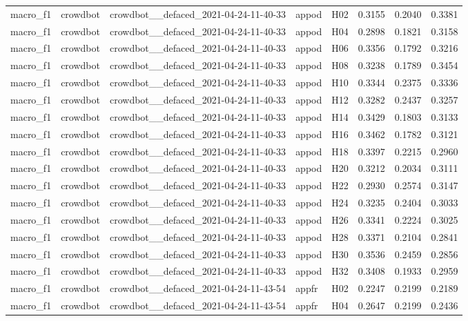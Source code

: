 \begin{table}[tbp]
\begin{tabular}{lllllrrr}
macro\_f1 & crowdbot & crowdbot\_\_defaced\_2021-04-24-11-40-33 & appod & H02 & 0.3155 & 0.2040 & 0.3381 \\
macro\_f1 & crowdbot & crowdbot\_\_defaced\_2021-04-24-11-40-33 & appod & H04 & 0.2898 & 0.1821 & 0.3158 \\
macro\_f1 & crowdbot & crowdbot\_\_defaced\_2021-04-24-11-40-33 & appod & H06 & 0.3356 & 0.1792 & 0.3216 \\
macro\_f1 & crowdbot & crowdbot\_\_defaced\_2021-04-24-11-40-33 & appod & H08 & 0.3238 & 0.1789 & 0.3454 \\
macro\_f1 & crowdbot & crowdbot\_\_defaced\_2021-04-24-11-40-33 & appod & H10 & 0.3344 & 0.2375 & 0.3336 \\
macro\_f1 & crowdbot & crowdbot\_\_defaced\_2021-04-24-11-40-33 & appod & H12 & 0.3282 & 0.2437 & 0.3257 \\
macro\_f1 & crowdbot & crowdbot\_\_defaced\_2021-04-24-11-40-33 & appod & H14 & 0.3429 & 0.1803 & 0.3133 \\
macro\_f1 & crowdbot & crowdbot\_\_defaced\_2021-04-24-11-40-33 & appod & H16 & 0.3462 & 0.1782 & 0.3121 \\
macro\_f1 & crowdbot & crowdbot\_\_defaced\_2021-04-24-11-40-33 & appod & H18 & 0.3397 & 0.2215 & 0.2960 \\
macro\_f1 & crowdbot & crowdbot\_\_defaced\_2021-04-24-11-40-33 & appod & H20 & 0.3212 & 0.2034 & 0.3111 \\
macro\_f1 & crowdbot & crowdbot\_\_defaced\_2021-04-24-11-40-33 & appod & H22 & 0.2930 & 0.2574 & 0.3147 \\
macro\_f1 & crowdbot & crowdbot\_\_defaced\_2021-04-24-11-40-33 & appod & H24 & 0.3235 & 0.2404 & 0.3033 \\
macro\_f1 & crowdbot & crowdbot\_\_defaced\_2021-04-24-11-40-33 & appod & H26 & 0.3341 & 0.2224 & 0.3025 \\
macro\_f1 & crowdbot & crowdbot\_\_defaced\_2021-04-24-11-40-33 & appod & H28 & 0.3371 & 0.2104 & 0.2841 \\
macro\_f1 & crowdbot & crowdbot\_\_defaced\_2021-04-24-11-40-33 & appod & H30 & 0.3536 & 0.2459 & 0.2856 \\
macro\_f1 & crowdbot & crowdbot\_\_defaced\_2021-04-24-11-40-33 & appod & H32 & 0.3408 & 0.1933 & 0.2959 \\
macro\_f1 & crowdbot & crowdbot\_\_defaced\_2021-04-24-11-43-54 & appfr & H02 & 0.2247 & 0.2199 & 0.2189 \\
macro\_f1 & crowdbot & crowdbot\_\_defaced\_2021-04-24-11-43-54 & appfr & H04 & 0.2647 & 0.2199 & 0.2436 \\

\end{tabular}
\end{table}
